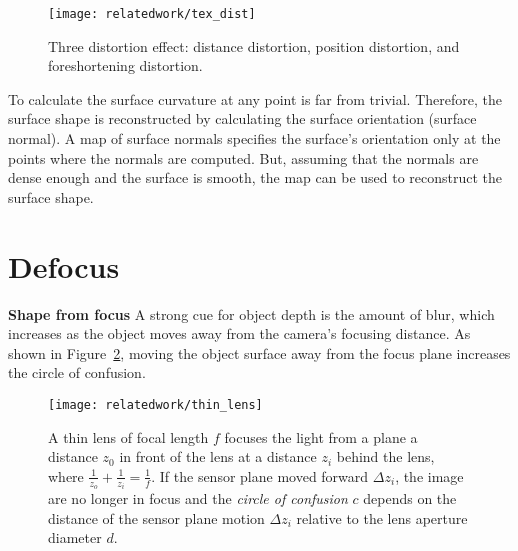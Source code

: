 \begin{figure}[h]
\centering
\texttt{[image: relatedwork/tex\_dist]}
\caption{Three distortion effect: distance distortion, position distortion, and foreshortening distortion.}
\label{fig:tex_dist}
\end{figure}

To calculate the surface curvature at any point is far from trivial. Therefore, the surface shape is reconstructed by calculating the surface orientation (surface normal). A map of surface normals specifies the surface's orientation only at the points where the normals are computed. But, assuming that the normals are dense enough and the surface is smooth, the map can be used to reconstruct the surface shape.

\section{Defocus}
\textbf{Shape from focus}
A strong cue for object depth is the amount of blur, which increases as the object moves away from the camera's focusing distance. As shown in Figure~\ref{fig:thin_lens}, moving the object surface away from the focus plane increases the circle of confusion.

\begin{figure}[h]
\centering
\texttt{[image: relatedwork/thin\_lens]}
\caption{A thin lens of focal length $f$ focuses the light from a plane a distance $z_0$ in front of the lens at a distance $z_i$ behind the lens, where $\frac{1}{z_o}+\frac{1}{z_i}=\frac{1}{f}$. If the sensor plane moved forward $\Delta z_i$, the image are no longer in focus and the \textit{circle of confusion} $c$ depends on the distance of the sensor plane motion $\Delta z_i$ relative to the lens aperture diameter $d$.}
\label{fig:thin_lens}
\end{figure}

